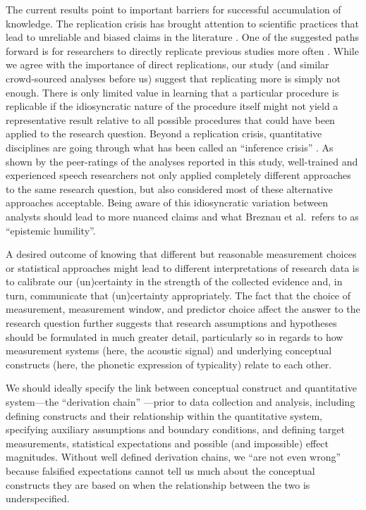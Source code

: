 \documentclass[Review,times,sageh]{sagej}
\begin{document}
The current results point to important barriers for successful accumulation of knowledge.
The replication crisis has brought attention to scientific practices that lead to unreliable and biased claims in the literature \citep[e.g.,][\citet{fidler2018reproducibility}]{vazire2017quality}.
One of the suggested paths forward is for researchers to directly replicate previous studies more often \citep[e.g.,][]{open2015estimating, camerer2018evaluating}.
While we agree with the importance of direct replications, our study (and similar crowd-sourced analyses before us) suggest that replicating more is simply not enough.
There is only limited value in learning that a particular procedure is replicable if the idiosyncratic nature of the procedure itself might not yield a representative result relative to all possible procedures that could have been applied to the research question.
Beyond a replication crisis, quantitative disciplines are going through what has been called an ``inference crisis'' \citep{rotello2015more, starns2019assessing}.
As shown by the peer-ratings of the analyses reported in this study, well-trained and experienced speech researchers not only applied completely different approaches to the same research question, but also considered most of these alternative approaches acceptable.
Being aware of this idiosyncratic variation between analysts should lead to more nuanced claims and what Breznau et al.~refers to as ``epistemic humility''.

A desired outcome of knowing that different but reasonable measurement choices or statistical approaches might lead to different interpretations of research data is to calibrate our (un)certainty in the strength of the collected evidence and, in turn, communicate that (un)certainty appropriately.
The fact that the choice of measurement, measurement window, and predictor choice affect the answer to the research question further suggests that research assumptions and hypotheses should be formulated in much greater detail, particularly so in regards to how measurement systems (here, the acoustic signal) and underlying conceptual constructs (here, the phonetic expression of typicality) relate to each other.

We should ideally specify the link between conceptual construct and quantitative system---the ``derivation chain'' \citep{dubin1970theory, meehl1990summaries}---prior to data collection and analysis, including defining constructs and their relationship within the quantitative system, specifying auxiliary assumptions and boundary conditions, and defining target measurements, statistical expectations and possible (and impossible) effect magnitudes.
Without well defined derivation chains, we ``are not even wrong'' \citep{scheel2022most} because falsified expectations cannot tell us much about the conceptual constructs they are based on when the relationship between the two is underspecified.
\end{document}
